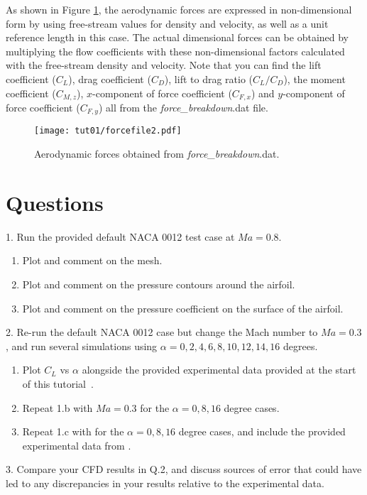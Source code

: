 As shown in Figure \ref{fig1:forcefile2}, the aerodynamic forces are expressed in non-dimensional form by using free-stream values for density and velocity, as well as a unit reference length in this case. The actual dimensional forces can be obtained by multiplying the flow coefficients with these non-dimensional factors calculated with the free-stream density and velocity. Note that you can find the lift coefficient ($C_L$), drag coefficient ($C_D$), lift to drag ratio ($C_L / C_D$), the moment coefficient ($C_{M,z}$), $x$-component of force coefficient ($C_{F,x}$) and $y$-component of force coefficient ($C_{F,y}$) all from the \textit{force\_breakdown}.dat file.
\begin{figure}[htbp]
    \centering
    \texttt{[image: tut01/forcefile2.pdf]}
    \caption{Aerodynamic forces obtained from \textit{force\_breakdown}.dat.}
    \label{fig1:forcefile2}
\end{figure}
\clearpage
\section{Questions}
1. Run the provided default NACA 0012 test case at $Ma=0.8$.
\begin{enumerate}[label=(\alph*)]
    \item Plot and comment on the mesh.
    \item Plot and comment on the pressure contours around the airfoil.
    \item Plot and comment on the pressure coefficient on the surface of the airfoil.
\end{enumerate}
2. Re-run the default NACA 0012 case but change the Mach number to $Ma=0.3$, and run several simulations using $\alpha = 0, 2, 4, 6, 8, 10, 12, 14, 16$ degrees.
\begin{enumerate}[label=(\alph*)]
    \item Plot $C_{L}$ vs $\alpha$ alongside the provided experimental data provided at the start of this tutorial~\cite{ladson1988effects}.
    \item Repeat 1.b with $Ma = 0.3$ for the $\alpha = 0, 8, 16$ degree cases.
    \item Repeat 1.c with for the $\alpha = 0, 8, 16$ degree cases, and include the provided experimental data from \cite{ladson1987pressure}.
\end{enumerate}
3. Compare your CFD results in Q.2, and discuss sources of error that could have led to any discrepancies in your results relative to the experimental data.
